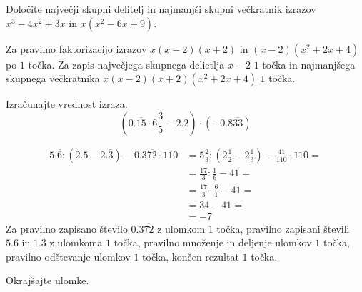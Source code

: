 \documentclass[addpoints]{exam}
\begin{document}
\begin{questions}





    \question[4]
    Določite največji skupni delitelj in najmanjši skupni večkratnik izrazov $x^3-4x^2+3x$ in $x(x^2-6x+9)$.

    \begin{solution}[7cm]
        Za pravilno faktorizacijo izrazov $x(x-2)(x+2)$ in $(x-2)(x^2+2x+4)$ po $1$ točka. 
        Za zapis največjega skupnega delietlja $x-2$ $1$ točka in najmanjšega skupnega večkratnika $x(x-2)(x+2)(x^2+2x+4)$ $1$ točka.
    \end{solution}
    

    

    \question[5]
    Izračunajte vrednost izraza.
        $$\left(0.\overline{15}\cdot 6\frac{3}{5}-2.2\right)\cdot\left(-0.8\overline{33}\right) $$

        \begin{solution}[4cm]
            \begin{align*}
                5.\overline{6}:(2.5-2.\overline{3}) - 0.3\overline{72}\cdot 110&=5\frac{2}{3}:(2\frac{1}{2}-2\frac{1}{3})- \frac{41}{110}\cdot 110 = \\
                                                                            &=\frac{17}{3}:\frac{1}{6}-41= \\
                                                                            &=\frac{17}{3}\cdot \frac{6}{1}-41= \\
                                                                            &=34-41= \\
                                                                            &= -7
            \end{align*}
            Za pravilno zapisano število $0.3\overline{72}$ z ulomkom $1$ točka, pravilno zapisani števili $5.\overline{6}$ in $1.\overline{3}$ z ulomkoma $1$ točka, pravilno množenje in deljenje ulomkov $1$ točka, pravilno odštevanje ulomkov $1$ točka, končen rezultat $1$ točka.
        \end{solution}




    \newpage

    \question
    Okrajšajte ulomke.
\end{questions}
\end{document}
